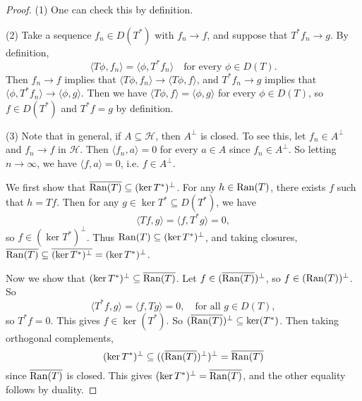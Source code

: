 \begin{proof}
  (1) One can check this by definition.

  (2) Take a sequence $f_n \in D(T^*)$ with
  $f_n \to f$, and suppose that $T^* f_n \to g$. By
  definition,
  \[
    \langle T \phi, f_n \rangle
    = \langle \phi, T^* f_n \rangle
    \quad \text{for every $\phi \in D(T)$}.
  \]
  Then $f_n \to f$ implies that
  $\langle T \phi, f_n \rangle \to \langle T \phi, f \rangle$,
  and $T^* f_n \to g$ implies that $\langle \phi, T^* f_n \rangle \to \langle \phi, g \rangle$.
  Then we have
  $\langle T \phi, f \rangle = \langle \phi, g \rangle$
  for every $\phi \in D(T)$, so
  $f \in D(T^*)$ and $T^* f = g$ by definition.

  (3) Note that in general, if $A \subseteq \mathcal{H}$, then
  $A^\perp$ is closed. To see this, let $f_n \in A^\perp$
  and $f_n \to f$ in $\mathcal{H}$. Then
  $\langle f_n, a \rangle = 0$ for every $a \in A$
  since $f_n \in A^\perp$. So letting
  $n \to \infty$, we have $\langle f, a \rangle = 0$,
  i.e. $f \in A^\perp$.

  We first show that $\overline{\operatorname{Ran}(T)} \subseteq (\ker T^*)^\perp$.
  For any $h \in \operatorname{Ran}(T)$, there exists $f$ such that
  $h = Tf$. Then for any $g \in \ker T^* \subseteq D(T^*)$,
  we have
  \[
    \langle Tf, g \rangle
    = \langle f, T^* g \rangle = 0,
  \]
  so $f \in (\ker T^*)^\perp$.
  Thus $\operatorname{Ran}(T) \subseteq (\ker T^*)^\perp$, and taking
  closures,
  $\overline{\operatorname{Ran}(T)} \subseteq \overline{(\ker T^*)^\perp} = (\ker T^*)^\perp$.

  Now we show that $(\ker T^*)^\perp \subseteq \overline{\operatorname{Ran}(T)}$.
  Let $f \in (\overline{\operatorname{Ran}(T)})^\perp$, so
  $f \in (\operatorname{Ran}(T))^\perp$. So
  \[
    \langle T^* f, g \rangle = \langle f, Tg \rangle = 0, \quad \text{for all $g \in D(T)$},
  \]
  so $T^* f = 0$. This gives $f \in \ker(T^*)$.
  So $(\overline{\operatorname{Ran}(T)})^\perp \subseteq \ker(T^*)$.
  Then taking orthogonal complements,
  \[
    (\ker T^*)^\perp \subseteq ((\overline{\operatorname{Ran}(T)})^\perp)^\perp
    = \overline{\operatorname{Ran}(T)}
  \]
  since $\overline{\operatorname{Ran}(T)}$ is closed. This
  gives $(\ker T^*)^\perp = \overline{\operatorname{Ran}(T)}$, and
  the other equality follows by duality.


\end{proof}
